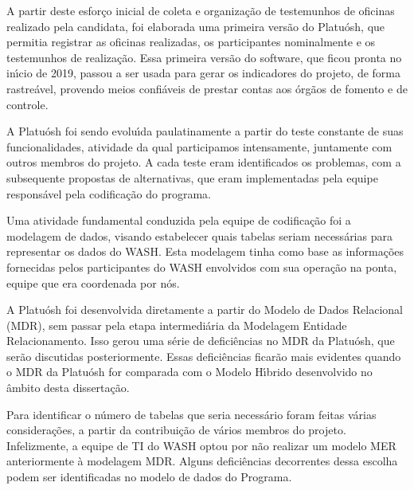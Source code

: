 \documentclass[
12pt,		%
openright,	%
twoside,  %
a4paper,			%
chapter=TITLE,		%
english,			%
french,				%
spanish,			%
brazil				%
]{USPSC-classe/USPSC}
\begin{document}
A partir deste esfor\c{c}o inicial de coleta e organiza\c{c}\~ao de testemunhos de oficinas realizado pela candidata, foi elaborada uma primeira vers\~ao do Platu\'osh, que permitia registrar as oficinas realizadas, os participantes nominalmente e os testemunhos de realiza\c{c}\~ao. Essa primeira vers\~ao do software, que ficou pronta no in\'{\i}cio de 2019, passou a ser usada para gerar os indicadores do projeto, de forma rastre\'avel, provendo meios confi\'aveis de prestar contas aos \'org\~aos de fomento e de controle.









A Platu\'osh foi sendo evolu\'{\i}da paulatinamente a partir do teste constante de suas funcionalidades, atividade da qual participamos intensamente, juntamente com outros membros do projeto. A cada teste eram identificados os problemas, com a subsequente propostas de alternativas, que eram implementadas pela equipe respons\'avel pela codifica\c{c}\~ao do programa.









Uma atividade fundamental conduzida pela equipe de codifica\c{c}\~ao foi a modelagem de dados, visando estabelecer quais tabelas seriam necess\'arias para representar os dados do WASH. Esta modelagem tinha como base as informa\c{c}\~oes fornecidas pelos participantes do WASH envolvidos com sua opera\c{c}\~ao na ponta, equipe que era coordenada por n\'os.









A Platu\'osh foi desenvolvida diretamente a partir do Modelo de Dados Relacional (MDR), sem passar pela etapa intermedi\'aria da Modelagem Entidade Relacionamento. Isso gerou uma s\'erie de defici\^encias no MDR da Platu\'osh, que ser\~ao discutidas posteriormente. Essas defici\^encias ficar\~ao mais evidentes quando o MDR da Platu\'osh for comparada com o Modelo H\'{\i}brido desenvolvido no \^ambito desta disserta\c{c}\~ao.









Para identificar o n\'umero de tabelas que seria necess\'ario foram feitas v\'arias considera\c{c}\~oes, a partir da contribui\c{c}\~ao de v\'arios membros do projeto. Infelizmente, a equipe de TI do WASH optou por n\~ao realizar um modelo MER anteriormente \`a modelagem MDR. Alguns defici\^encias decorrentes dessa escolha podem ser identificadas no modelo de dados do Programa.
\end{document}
